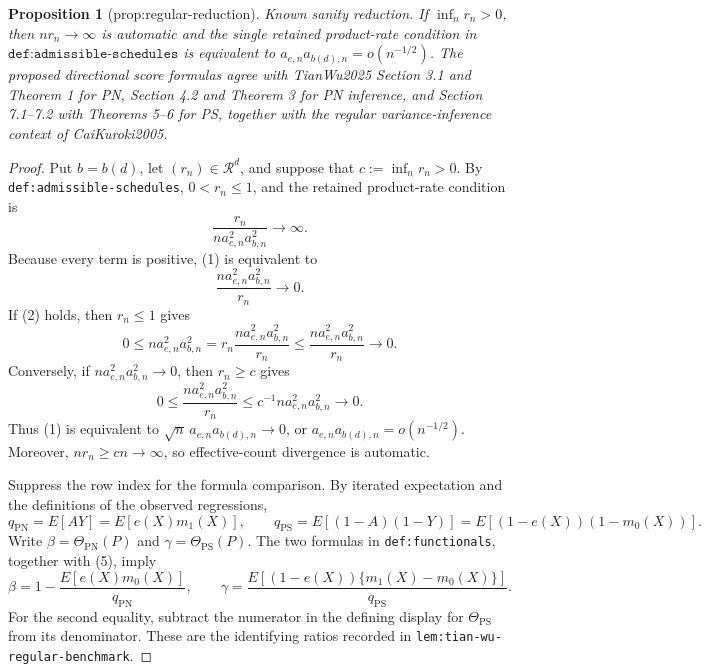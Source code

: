 \documentclass{article}
\newtheorem{proposition}{Proposition}
\begin{document}
\begin{proposition}[prop:regular-reduction]\label{prop:regular-reduction}
Known sanity reduction. If \(\inf_n r_n>0\), then \(nr_n\to\infty\) is automatic and the single retained product-rate condition in \(\texttt{def:admissible-schedules}\) is equivalent to \(a_{e,n}a_{b(d),n}=o(n^{-1/2})\). The proposed directional score formulas agree with TianWu2025 Section 3.1 and Theorem 1 for PN, Section 4.2 and Theorem 3 for PN inference, and Section 7.1--7.2 with Theorems 5--6 for PS, together with the regular variance-inference context of CaiKuroki2005.
\end{proposition}
\begin{proof}
Put \(b=b(d)\), let \((r_n)\in\mathcal R^d\), and suppose that \(c:=\inf_n r_n>0\). By \texttt{def:admissible-schedules}, \(0<r_n\le1\), and the retained product-rate condition is
\[
\frac{r_n}{n a_{e,n}^2a_{b,n}^2}\longrightarrow\infty.
\tag{1}
\]
Because every term is positive, (1) is equivalent to
\[
\frac{n a_{e,n}^2a_{b,n}^2}{r_n}\longrightarrow0.
\tag{2}
\]
If (2) holds, then \(r_n\le1\) gives
\[
0\le n a_{e,n}^2a_{b,n}^2=r_n\frac{n a_{e,n}^2a_{b,n}^2}{r_n}\le\frac{n a_{e,n}^2a_{b,n}^2}{r_n}\longrightarrow0.
\tag{3}
\]
Conversely, if \(n a_{e,n}^2a_{b,n}^2\to0\), then \(r_n\ge c\) gives
\[
0\le\frac{n a_{e,n}^2a_{b,n}^2}{r_n}\le c^{-1}n a_{e,n}^2a_{b,n}^2\longrightarrow0.
\tag{4}
\]
Thus (1) is equivalent to \(\sqrt n\,a_{e,n}a_{b(d),n}\to0\), or \(a_{e,n}a_{b(d),n}=o(n^{-1/2})\). Moreover, \(nr_n\ge cn\to\infty\), so effective-count divergence is automatic.

Suppress the row index for the formula comparison. By iterated expectation and the definitions of the observed regressions,
\[
q_{\mathrm{PN}}=E[AY]=E[e(X)m_1(X)],\qquad q_{\mathrm{PS}}=E[(1-A)(1-Y)]=E[(1-e(X))(1-m_0(X))].
\tag{5}
\]
Write \(\beta=\Theta_{\mathrm{PN}}(P)\) and \(\gamma=\Theta_{\mathrm{PS}}(P)\). The two formulas in \texttt{def:functionals}, together with (5), imply
\[
\beta=1-\frac{E[e(X)m_0(X)]}{q_{\mathrm{PN}}},\qquad \gamma=\frac{E[(1-e(X))\{m_1(X)-m_0(X)\}]}{q_{\mathrm{PS}}}.
\tag{6}
\]
For the second equality, subtract the numerator in the defining display for \(\Theta_{\mathrm{PS}}\) from its denominator. These are the identifying ratios recorded in \texttt{lem:tian-wu-regular-benchmark}.


\end{proof}
\end{document}
